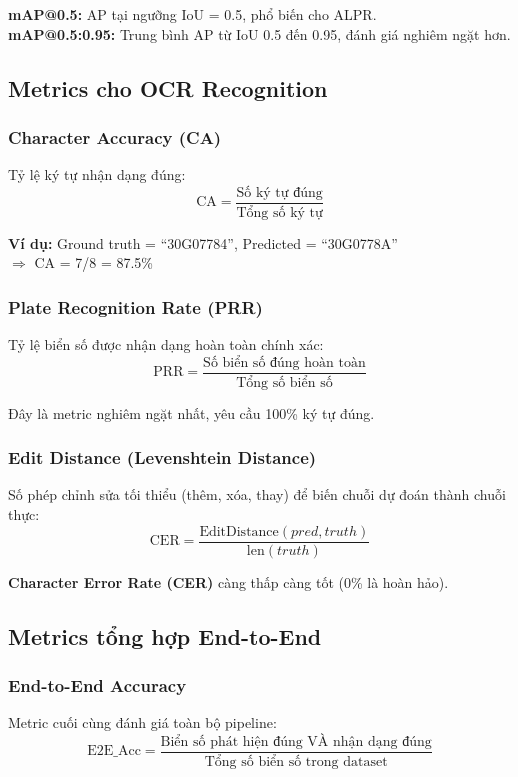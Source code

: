 \textbf{mAP@0.5:} AP tại ngưỡng IoU = 0.5, phổ biến cho ALPR. \\
\textbf{mAP@0.5:0.95:} Trung bình AP từ IoU 0.5 đến 0.95, đánh giá nghiêm ngặt hơn.

\subsection{Metrics cho OCR Recognition}

\subsubsection{Character Accuracy (CA)}
Tỷ lệ ký tự nhận dạng đúng:
\begin{equation}
    \text{CA} = \frac{\text{Số ký tự đúng}}{\text{Tổng số ký tự}}
\end{equation}

\textbf{Ví dụ:} Ground truth = ``30G07784'', Predicted = ``30G0778A'' \\
$\Rightarrow$ CA = 7/8 = 87.5\%

\subsubsection{Plate Recognition Rate (PRR)}
Tỷ lệ biển số được nhận dạng hoàn toàn chính xác:
\begin{equation}
    \text{PRR} = \frac{\text{Số biển số đúng hoàn toàn}}{\text{Tổng số biển số}}
\end{equation}

Đây là metric nghiêm ngặt nhất, yêu cầu 100\% ký tự đúng.

\subsubsection{Edit Distance (Levenshtein Distance)}
Số phép chỉnh sửa tối thiểu (thêm, xóa, thay) để biến chuỗi dự đoán thành chuỗi thực:
\begin{equation}
    \text{CER} = \frac{\text{EditDistance}(pred, truth)}{\text{len}(truth)}
\end{equation}

\textbf{Character Error Rate (CER)} càng thấp càng tốt (0\% là hoàn hảo).

\subsection{Metrics tổng hợp End-to-End}

\subsubsection{End-to-End Accuracy}
Metric cuối cùng đánh giá toàn bộ pipeline:
\begin{equation}
    \text{E2E\_Acc} = \frac{\text{Biển số phát hiện đúng VÀ nhận dạng đúng}}{\text{Tổng số biển số trong dataset}}
\end{equation}

